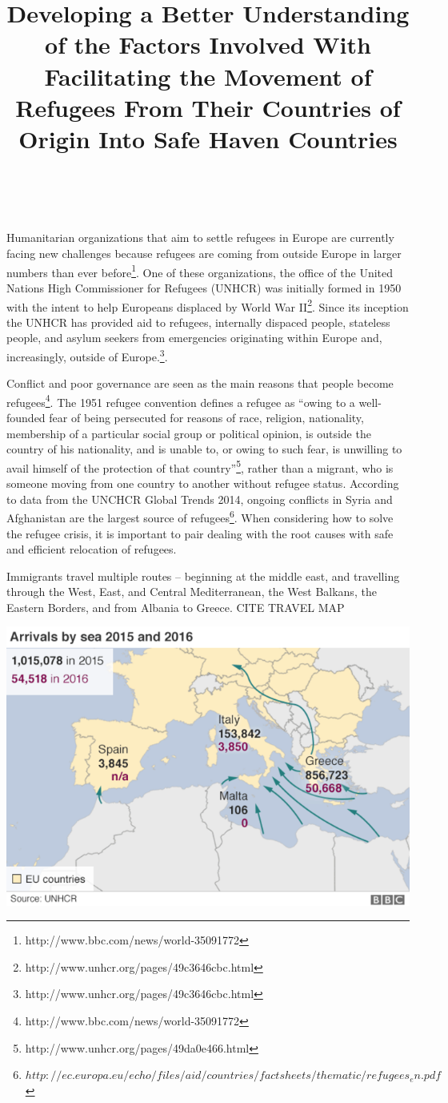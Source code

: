 \documentclass{article}
\title{Developing a Better Understanding of the Factors Involved With Facilitating the Movement of Refugees From Their Countries of Origin Into Safe Haven Countries}
\author{\ \ }
\begin{document}
\maketitle

Humanitarian organizations that aim to settle refugees in Europe are currently facing new challenges because refugees are coming from outside Europe in larger numbers than ever before\footnote{http://www.bbc.com/news/world-35091772}. One of these organizations, the office of the United Nations High Commissioner for Refugees (UNHCR) was initially formed in 1950 with the intent to help Europeans displaced by World War II\footnote{http://www.unhcr.org/pages/49c3646cbc.html}. Since its inception the UNHCR has provided aid to refugees, internally dispaced people, stateless people, and asylum seekers from emergencies originating within Europe and, increasingly, outside of Europe.\footnote{http://www.unhcr.org/pages/49c3646cbc.html}.

Conflict and poor governance are seen as the main reasons that people become refugees\footnote{http://www.bbc.com/news/world-35091772}. The 1951 refugee convention defines a refugee as ``owing to a well-founded fear of being persecuted for reasons of race, religion, nationality, membership of a particular social group or political opinion, is outside the country of his nationality, and is unable to, or owing to such fear, is unwilling to avail himself of the protection of that country''\footnote{http://www.unhcr.org/pages/49da0e466.html}, rather than a migrant, who is someone moving from one country to another without refugee status. According to data from the UNCHCR Global Trends 2014, ongoing conflicts in Syria and Afghanistan are the largest source of refugees\footnote{$http://ec.europa.eu/echo/files/aid/countries/factsheets/thematic/refugees_en.pdf$}. When considering how to solve the refugee crisis, it is important to pair dealing with the root causes with safe and efficient relocation of refugees.

Immigrants travel multiple routes -- beginning at the middle east, and travelling through the West, East, and Central Mediterranean, the West Balkans, the Eastern Borders, and from Albania to Greece.
CITE TRAVEL MAP

\begin{center}
\includegraphics[scale=0.5]{travelmap}
\end{center}
\end{document}
